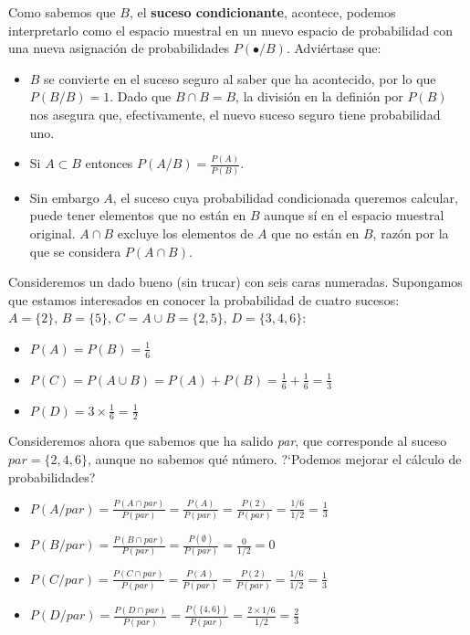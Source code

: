 \documentclass[11pt]{article}
\begin{document}
    Como sabemos que \(B\), el \textbf{suceso condicionante}, acontece,
podemos interpretarlo como el espacio muestral en un nuevo espacio de
probabilidad con una nueva asignación de probabilidades
\(P(\bullet/B)\). Adviértase que: 
\begin{itemize}
\item \(B\) se convierte en el suceso
seguro al saber que ha acontecido, por lo que \(P(B/B)=1\). Dado que
\(B\cap B = B\), la división en la definión por \(P(B)\) nos asegura
que, efectivamente, el nuevo suceso seguro tiene probabilidad uno. 
\item Si
\(A \subset B\) entonces \(P(A/B) = \frac{P(A)}{P(B)}\). 
\item Sin embargo
\(A\), el suceso cuya probabilidad condicionada queremos calcular, puede
tener elementos que no están en \(B\) aunque sí en el espacio muestral
original. \(A\cap B\) excluye los elementos de \(A\) que no están en
\(B\), razón por la que se considera \(P(A\cap B)\).
\end{itemize}


    Consideremos un dado bueno (sin trucar) con seis caras numeradas.
Supongamos que estamos interesados en conocer la probabilidad de cuatro
sucesos:
\(A =\{2\}, \, B=\{5\}, \, C=A\cup B =\{2, 5\}, \, D=\{3, 4, 6\}\):
\begin{itemize}
 \item
\(P(A) = P(B) = \frac{1}{6}\) 
\item
\(P(C) = P(A\cup B)=P(A)+P(B)=\frac{1}{6}+\frac{1}{6}=\frac{1}{3}\) 
\item
\(P(D) = 3 \times \frac{1}{6} = \frac{1}{2}\)
\end{itemize}


    Consideremos ahora que sabemos que ha salido \emph{par}, que corresponde
al suceso \(par=\{2,4,6\}\), aunque no sabemos qué número. ?`Podemos
mejorar el cálculo de probabilidades? 

\begin{itemize}
\item
\(P(A/par) = \frac{P(A\cap par)}{P(par)} =\frac{P(A)}{P(par)}=\frac{P(2)}{P(par)}=\frac{1/6}{1/2}=\frac{1}{3}\)
\item
\(P(B/par) = \frac{P(B\cap par)}{P(par)} =\frac{P(\emptyset)}{P(par)}=\frac{0}{1/2}=0\)
\item
\(P(C/par) = \frac{P(C\cap par)}{P(par)} =\frac{P(A)}{P(par)}=\frac{P(2)}{P(par)}=\frac{1/6}{1/2}=\frac{1}{3}\)
\item
\(P(D/par) = \frac{P(D\cap par)}{P(par)} = \frac{P(\{4,6\})}{P(par)} =\frac{2\times 1/6}{1/2}=\frac{2}{3}\)
\end{itemize}
\end{document}
